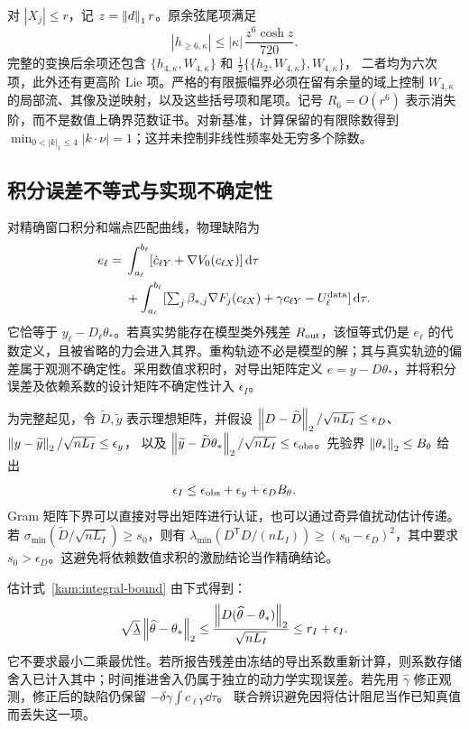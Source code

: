 对 $|X_j|\le r$，记 $z=\left\lVert d\right\rVert_1r$。原余弦尾项满足
\begin{equation}\label{ss:cosine-tail}
 |h_{\ge6,\kappa}|\le|\kappa|\,\frac{z^6\cosh z}{720}.
\end{equation}
完整的变换后余项还包含
$\{h_{4,\kappa},W_{4,\kappa}\}$ 和
$\tfrac12\{\{h_2,W_{4,\kappa}\},W_{4,\kappa}\}$，
二者均为六次项，此外还有更高阶 Lie 项。严格的有限振幅界必须在留有余量的域上控制 $W_{4,\kappa}$ 的局部流、其像及逆映射，以及这些括号项和尾项。记号 $R_6=O(r^6)$ 表示消失阶，而不是数值上确界范数证书。对新基准，计算保留的有限除数得到 $\min_{0<|k|_1\le4}|k\cdot\nu|=1$；这并未控制非线性频率处无穷多个除数。

\subsection{积分误差不等式与实现不确定性}
\label{ss:integral-error}

对精确窗口积分和端点匹配曲线，物理缺陷为
\begin{equation}\label{ss:physical-defect}
\begin{aligned}
 e_\ell={}&\int_{a_\ell}^{b_\ell}
 [\dot c_{\ell Y}+\nabla V_0(c_{\ell X})]\,\mathrm d\tau\\
 &+\int_{a_\ell}^{b_\ell}
 [\textstyle\sum_j\beta_{*,j}\nabla F_j(c_{\ell X})
  +\gamma c_{\ell Y}-U_\ell^{\rm data}]\,\mathrm d\tau.
\end{aligned}
\end{equation}
它恰等于 $y_\ell-D_\ell\theta_*$。若真实势能存在模型类外残差 $R_{\rm out}$，该恒等式仍是 $e_\ell$ 的代数定义，且被省略的力会进入其界。重构轨迹不必是模型的解；其与真实轨迹的偏差属于观测不确定性。采用数值求积时，对导出矩阵定义 $e=y-D\theta_*$，并将积分误差及依赖系数的设计矩阵不确定性计入 $\epsilon_I$。

为完整起见，令 $\widetilde D,\widetilde y$ 表示理想矩阵，并假设
$\left\lVert D-\widetilde D\right\rVert_2/\sqrt{nL_I}\le\epsilon_D$、
$\left\lVert y-\widetilde y\right\rVert_2/\sqrt{nL_I}\le\epsilon_y$，
以及 $\left\lVert\widetilde y-\widetilde D\theta_*\right\rVert_2/\sqrt{nL_I}\le\epsilon_{\rm obs}$。先验界 $\left\lVert\theta_*\right\rVert_2\le B_\theta$ 给出
\[
 \epsilon_I\le\epsilon_{\rm obs}+\epsilon_y+\epsilon_D B_\theta.
\]
Gram 矩阵下界可以直接对导出矩阵进行认证，也可以通过奇异值扰动估计传递。若 $\sigma_{\min}(\widetilde D/\sqrt{nL_I})\ge s_0$，则有 $\lambda_{\min}(D^{\mathsf T}D/(nL_I))\ge(s_0-\epsilon_D)^2$，其中要求 $s_0>\epsilon_D$。这避免将依赖数值求积的激励结论当作精确结论。

估计式~\eqref{kam:integral-bound} 由下式得到：
\[
 \sqrt{\underline\lambda}\left\lVert\widehat\theta-\theta_*\right\rVert_2
 \le\frac{\left\lVert D(\widehat\theta-\theta_*)\right\rVert_2}{\sqrt{nL_I}}
 \le r_I+\epsilon_I.
\]
它不要求最小二乘最优性。若所报告残差由冻结的导出系数重新计算，则系数存储舍入已计入其中；时间推进舍入仍属于独立的动力学实现误差。若先用 $\widehat\gamma$ 修正观测，修正后的缺陷仍保留
$-\delta\gamma\int c_{\ell Y}\dd\tau$。
联合辨识避免因将估计阻尼当作已知真值而丢失这一项。

